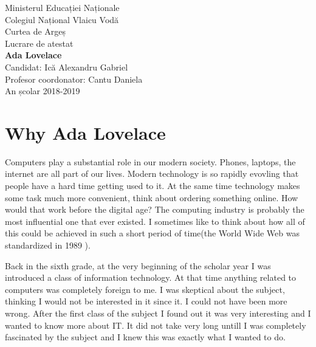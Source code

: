 \documentclass{article}
\begin{document}
\begin{titlepage}
    \centering
    \begin{center}
        {\Large Ministerul Educației Naționale}\\
        {\Large Colegiul Național Vlaicu Vodă}\\
        {\Large Curtea de Argeș}\\
        \vfill
        {\Large Lucrare de atestat}\\
        \vspace*{0.8cm}
        {\Large \textbf{Ada Lovelace}}\\
        \vfill
        {\Large Candidat: Ică Alexandru Gabriel}\\
        \vspace*{0.8cm}
        {\Large Profesor coordonator: Cantu Daniela}\\
        \vspace*{0.8cm}
        {\Large An școlar 2018-2019}
    \end{center}
\end{titlepage}


\tableofcontents
\newpage

\section{Why Ada Lovelace}

Computers play a substantial role in our modern society. Phones, laptops, the internet are all part of our lives. Modern technology is so rapidly evovling that people have a hard time getting used to it. At the same time technology makes some task much more convenient, think about ordering something online. How would that work before the digital age? The computing industry is probably the most influential one that ever existed. I sometimes like to think about how all of this could be achieved in such a short period of time(the World Wide Web was standardized in 1989 \cite{TheInternet}).

\vspace{0.3cm}

Back in the sixth grade, at the very beginning of the scholar year I was introduced a class of information technology. At that time anything related to computers was completely foreign to me. I was skeptical about the subject, thinking I would not be interested in it since it. I could not have been more wrong. After the first class of the subject I found out it was very interesting and I wanted to know more about IT. It did not take very long untill I was completely fascinated by the subject and I knew this was exactly what I wanted to do.
\end{document}
